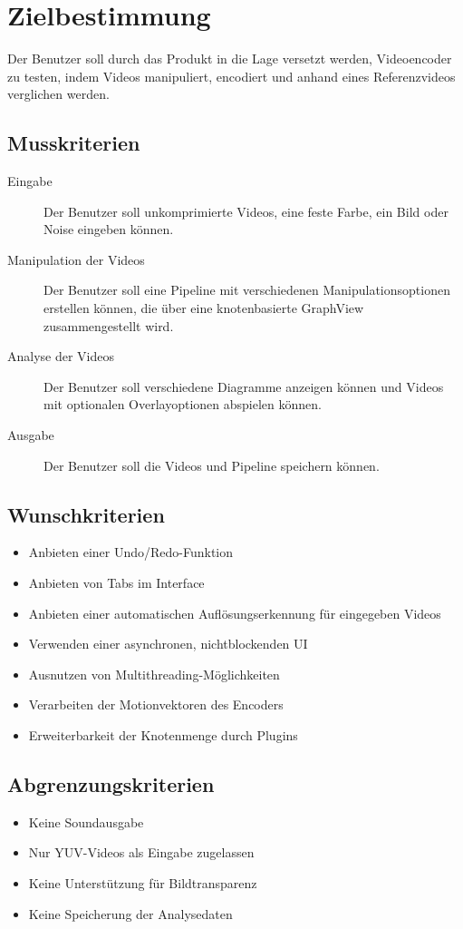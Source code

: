 \renewcommand{\labelitemi}{$-$}
\section{Zielbestimmung}

Der Benutzer soll durch das Produkt in die Lage versetzt werden, Videoencoder zu testen, indem Videos manipuliert, encodiert und anhand eines Referenzvideos verglichen werden.

\subsection{Musskriterien}

\begin{description}
	\item[Eingabe] Der Benutzer soll unkomprimierte Videos, eine feste Farbe, ein Bild oder Noise eingeben können.
	\item[Manipulation der Videos] Der Benutzer soll eine Pipeline mit verschiedenen Manipulationsoptionen erstellen können, die über eine knotenbasierte GraphView zusammengestellt wird.
	\item[Analyse der Videos] Der Benutzer soll verschiedene Diagramme anzeigen können und Videos mit optionalen Overlayoptionen abspielen können.
	\item[Ausgabe] Der Benutzer soll die Videos und Pipeline speichern können.
\end{description}

\subsection{Wunschkriterien}

\begin{itemize}
	\item Anbieten einer Undo/Redo-Funktion
	\item Anbieten von Tabs im Interface
	\item Anbieten einer automatischen Auflösungserkennung für eingegeben Videos
	\item Verwenden einer asynchronen, nichtblockenden UI
	\item Ausnutzen von Multithreading-Möglichkeiten
	\item Verarbeiten der Motionvektoren des Encoders
	\item Erweiterbarkeit der Knotenmenge durch Plugins
\end{itemize}

\subsection{Abgrenzungskriterien}

\begin{itemize}
	\item Keine Soundausgabe
	\item Nur YUV-Videos als Eingabe zugelassen
    \item Keine Unterstützung für Bildtransparenz
	\item Keine Speicherung der Analysedaten
\end{itemize}

